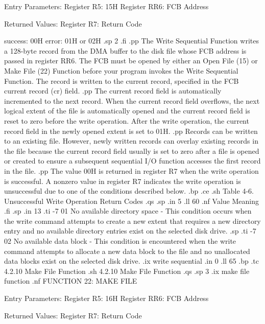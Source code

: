              Entry Parameters:
                Register   R5:  15H
                Register  RR6:  FCB Address

             Returned  Values:
                Register   R7:  Return Code

                                success:  00H
                                  error:  01H or 02H
.sp 2
.fi
.pp
The Write Sequential Function writes a 128-byte record from the
DMA buffer to the disk file whose FCB address is passed in 
register  RR6. The FCB must be opened by either an Open File (15)
or Make File (22) Function before your program invokes
the Write Sequential Function. The record is written
to the current record, specified in the FCB current record (cr)
field. 
.pp
The current record field is automatically incremented to the next record.
When the current record  field overflows, the next logical extent of the
file is automatically opened and the current record field is reset to zero
before the write operation. After the write operation, the current record
field in the newly opened extent is set to 01H. 
.pp
Records can be written to an existing file. However, newly
written records can overlay existing records in the file because the
current record field usually is set to zero after a file is
opened or created to ensure a subsequent sequential I/O function accesses
the first record in the file. 
.pp
The value 00H is returned in register   R7 when the
write operation is successful. A nonzero value in register
  R7 indicates the write operation is unsuccessful
due to one of the conditions described below.
.bp
.ce
.sh
Table 4-6.  Unsuccessful Write Operation Return Codes
.qs
.sp
.in 5
.ll 60
.nf
Value                        Meaning
.fi
.sp
.in 13
.ti -7
01     No available directory space - This condition occurs when
the write command attempts to create a new extent that requires a
new directory entry and no available directory entries exist on
the selected disk drive.
.sp
.ti -7
02     No available data block - This condition is encountered when
the write command attempts to allocate a new data block to the
file and no unallocated data blocks exist on the selected disk drive.
.ix write sequential
.in 0
.ll 65
.bp
.tc         4.2.10  Make File Function
.sh
4.2.10  Make File Function
.qs
.sp 3
.ix make file function
.nf
                    FUNCTION 22:  MAKE FILE

             Entry Parameters:
                Register   R5:  16H
                Register  RR6:  FCB Address

             Returned  Values:
                Register   R7:  Return Code

